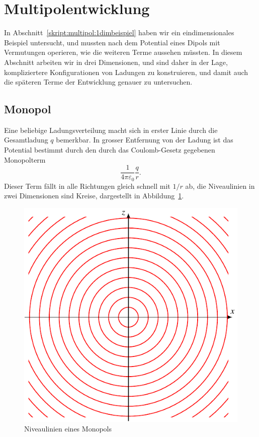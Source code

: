 %
%
%
\section{Multipolentwicklung}
In Abschnitt~\ref{skript:multipol:1dimbeispiel} haben wir ein
eindimensionales Beispiel untersucht, und mussten nach dem Potential
eines Dipols mit Vermutungen operieren, wie die weiteren Terme aussehen
müssten.
In diesem Abschnitt arbeiten wir in drei Dimensionen, und sind daher
in der Lage, kompliziertere Konfigurationen von Ladungen zu
konstruieren, und damit auch die späteren Terme der Entwicklung
genauer zu untersuchen.

\subsection{Monopol}
%
Eine beliebige Ladungsverteilung macht sich in erster Linie durch
die Gesamtladung $q$ bemerkbar.
In grosser Entfernung von der Ladung ist das Potential bestimmt durch
den durch das Coulomb-Gesetz gegebenen Monopolterm
\[
\frac{1}{4\pi\varepsilon_0}\frac{q}{r}.
\]
Dieser Term fällt in alle Richtungen gleich schnell mit $1/r$ ab,
die Niveaulinien in zwei Dimensionen sind Kreise, dargestellt in
Abbildung~\ref{skript:multipol:monopol}.
\begin{figure}
\centering
\includegraphics{chapters/tikz/monopol.pdf}
\caption{Niveaulinien eines Monopols%
\label{skript:multipol:monopol}}
\end{figure}

